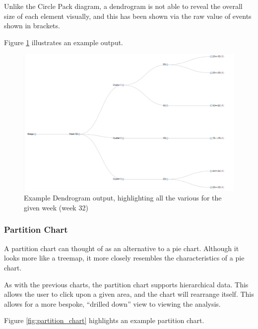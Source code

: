 Unlike the Circle Pack diagram, a dendrogram is not able to reveal the overall 
size of each element visually, and this has been shown via the raw value of 
events shown in brackets.

Figure \ref{fig:dendrogram} illustrates an example output.


\begin{landscape}
  \centering 
    \begin{figure}[H]
      \centering
        \includegraphics[scale=0.65]{chapter8/visualisation/dendrogram.png}
        \caption[Example Dendrogram output]
                {Example Dendrogram output, highlighting all the various for 
                the given week (week 32)}
        \label{fig:dendrogram}
    \end{figure}
\end{landscape}


\newpage
\subsubsection{Partition Chart}
A partition chart can thought of as an alternative to a pie chart. Although it 
looks more like a treemap, it more closely resembles the characteristics of a 
pie chart.

As with the previous charts, the partition chart supports hierarchical data. 
This allows the user to click upon a given area, and the chart will rearrange 
itself. This allows for a more bespoke, ``drilled down'' view to viewing the 
analysis.

Figure \ref{fig:partition_chart} highlights an example partition chart.

